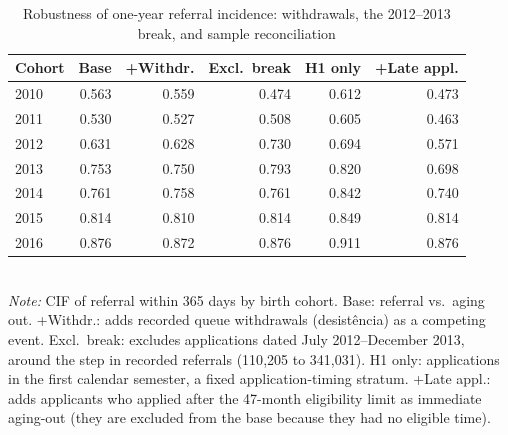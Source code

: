 \begin{table}[htbp]\centering
\caption{Robustness of one-year referral incidence: withdrawals, the 2012--2013 break, and sample reconciliation}
\label{tab:P2rob}
\footnotesize
\setlength{\tabcolsep}{4pt}
\begin{tabular}{lrrrrr}
\toprule
Cohort & Base & +Withdr. & Excl.\ break & H1 only & +Late appl. \\
\midrule
2010 & 0.563 & 0.559 & 0.474 & 0.612 & 0.473 \\
2011 & 0.530 & 0.527 & 0.508 & 0.605 & 0.463 \\
2012 & 0.631 & 0.628 & 0.730 & 0.694 & 0.571 \\
2013 & 0.753 & 0.750 & 0.793 & 0.820 & 0.698 \\
2014 & 0.761 & 0.758 & 0.761 & 0.842 & 0.740 \\
2015 & 0.814 & 0.810 & 0.814 & 0.849 & 0.814 \\
2016 & 0.876 & 0.872 & 0.876 & 0.911 & 0.876 \\
\bottomrule
\end{tabular}
\\[3pt]{\footnotesize \textit{Note:} CIF of referral within 365 days by birth cohort. Base: referral vs.\ aging out. +Withdr.: adds recorded queue withdrawals (desist\^encia) as a competing event. Excl.\ break: excludes applications dated July 2012--December 2013, around the step in recorded referrals (110{,}205 to 341{,}031). H1 only: applications in the first calendar semester, a fixed application-timing stratum. +Late appl.: adds applicants who applied after the 47-month eligibility limit as immediate aging-out (they are excluded from the base because they had no eligible time).}
\end{table}
